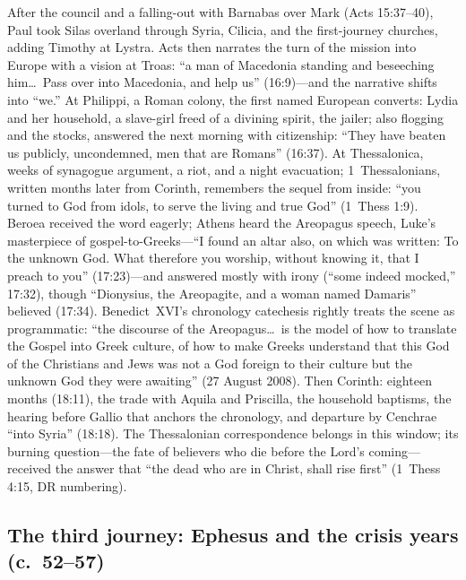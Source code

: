 After the council and a falling-out with Barnabas over Mark (Acts
15:37--40), Paul took Silas overland through Syria, Cilicia, and the
first-journey churches, adding Timothy at Lystra. Acts then narrates the
turn of the mission into Europe with a vision at Troas: ``a man of
Macedonia standing and beseeching him\ldots\ Pass over into Macedonia, and
help us'' (16:9)---and the narrative shifts into ``we.'' At Philippi, a
Roman colony, the first named European converts: Lydia and her household,
a slave-girl freed of a divining spirit, the jailer; also flogging and the
stocks, answered the next morning with citizenship: ``They have beaten us
publicly, uncondemned, men that are Romans'' (16:37). At Thessalonica,
weeks of synagogue argument, a riot, and a night evacuation; 1~Thessalonians,
written months later from Corinth, remembers the sequel from inside: ``you
turned to God from idols, to serve the living and true God'' (1~Thess 1:9).
Beroea received the word eagerly; Athens heard the Areopagus speech, Luke's
masterpiece of gospel-to-Greeks---``I found an altar also, on which was
written: To the unknown God. What therefore you worship, without knowing
it, that I preach to you'' (17:23)---and answered mostly with irony
(``some indeed mocked,'' 17:32), though ``Dionysius, the Areopagite, and a
woman named Damaris'' believed (17:34). Benedict~XVI's chronology
catechesis rightly treats the scene as programmatic: ``the discourse of
the Areopagus\ldots\ is the model of how to translate the Gospel into
Greek culture, of how to make Greeks understand that this God of the
Christians and Jews was not a God foreign to their culture but the
unknown God they were awaiting'' (27 August 2008). Then Corinth: eighteen months
(18:11), the trade with Aquila and Priscilla, the household baptisms, the
hearing before Gallio that anchors the chronology, and departure by
Cenchrae ``into Syria'' (18:18). The Thessalonian correspondence belongs
in this window; its burning question---the fate of believers who die
before the Lord's coming---received the answer that ``the dead who are in
Christ, shall rise first'' (1~Thess 4:15, DR numbering).

\subsection{The third journey: Ephesus and the crisis years (c.~52--57)}

